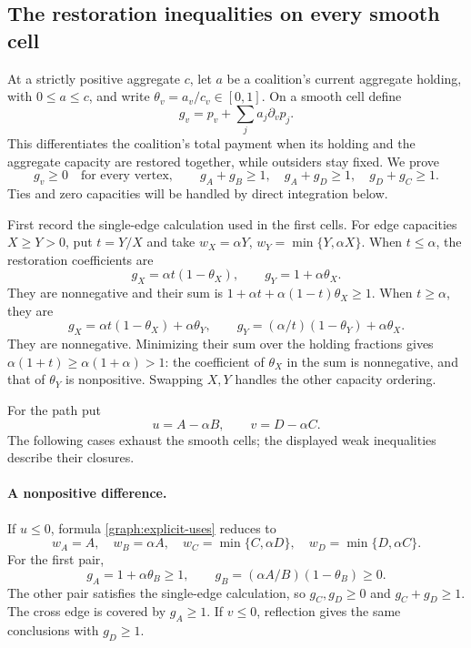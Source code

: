 \subsection{The restoration inequalities on every smooth cell}

At a strictly positive aggregate $c$, let $a$ be a coalition's current
aggregate holding, with $0\le a\le c$, and write
$\theta_v=a_v/c_v\in[0,1]$. On a smooth cell define
\begin{equation}\label{graph:restoration-coefficients}
 g_v=p_v+\sum_j a_j\partial_v p_j.
\end{equation}
This differentiates the coalition's total payment when its holding and
the aggregate capacity are restored together, while outsiders stay fixed.
We prove
\begin{equation}\label{graph:cover-certificate}
 g_v\ge0\quad\text{for every vertex},\qquad
 g_A+g_B\ge1,\quad g_A+g_D\ge1,\quad g_D+g_C\ge1.
\end{equation}
Ties and zero capacities will be handled by direct integration below.

First record the single-edge calculation used in the first cells. For
edge capacities $X\ge Y>0$, put $t=Y/X$ and take
$w_X=\alpha Y$, $w_Y=\min\{Y,\alpha X\}$.
When $t\le\alpha$, the restoration coefficients are
\[
 g_X=\alpha t(1-\theta_X),\qquad g_Y=1+\alpha\theta_X.
\]
They are nonnegative and their sum is
$1+\alpha t+\alpha(1-t)\theta_X\ge1$.
When $t\ge\alpha$, they are
\[
 g_X=\alpha t(1-\theta_X)+\alpha\theta_Y,\qquad
 g_Y=(\alpha/t)(1-\theta_Y)+\alpha\theta_X.
\]
They are nonnegative. Minimizing their sum over the holding fractions gives
$\alpha(1+t)\ge\alpha(1+\alpha)>1$: the coefficient of $\theta_X$ in
the sum is nonnegative, and that of $\theta_Y$ is nonpositive.
Swapping $X,Y$ handles the other capacity ordering.

For the path put
\[
 u=A-\alpha B,\qquad v=D-\alpha C.
\]
The following cases exhaust the smooth cells; the displayed weak
inequalities describe their closures.

\paragraph{A nonpositive difference.}
If $u\le0$, formula \eqref{graph:explicit-uses} reduces to
\[
 w_A=A,\quad w_B=\alpha A,\quad
 w_C=\min\{C,\alpha D\},\quad w_D=\min\{D,\alpha C\}.
\]
For the first pair,
\[
 g_A=1+\alpha\theta_B\ge1,\qquad
 g_B=(\alpha A/B)(1-\theta_B)\ge0.
\]
The other pair satisfies the single-edge calculation, so $g_C,g_D\ge0$
and $g_C+g_D\ge1$. The cross edge is covered by $g_A\ge1$.
If $v\le0$, reflection gives the same conclusions with $g_D\ge1$.

